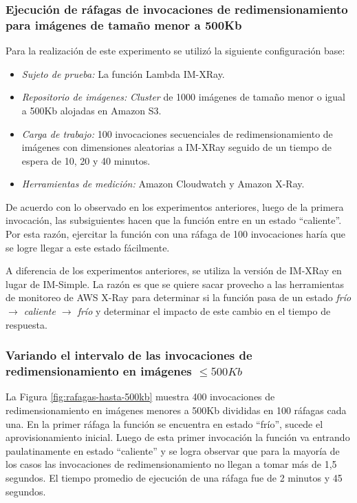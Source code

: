 \subsubsection{Ejecución de ráfagas de invocaciones de redimensionamiento para imágenes de tamaño menor a 500Kb}

Para la realización de este experimento se utilizó la siguiente configuración base:
\begin{itemize}
    \item \emph{Sujeto de prueba:} La función Lambda IM-XRay.
    \item \emph{Repositorio de imágenes:} \emph{Cluster} de 1000 imágenes de tamaño menor o igual a 500Kb alojadas en Amazon S3.
    \item \emph{Carga de trabajo:} 100 invocaciones secuenciales de redimensionamiento de imágenes con dimensiones aleatorias a IM-XRay seguido de un tiempo de espera de 10, 20 y 40 minutos.      
    \item \emph{Herramientas de medición:} Amazon Cloudwatch y Amazon X-Ray.
\end{itemize}
 
De acuerdo con lo observado en los experimentos anteriores, luego de la primera invocación, las subsiguientes hacen que la función entre en un estado ``caliente''. Por esta razón, ejercitar la función con una ráfaga de 100 invocaciones haría que se logre llegar a este estado fácilmente.

A diferencia de los experimentos anteriores, se utiliza la versión de IM-XRay en lugar de IM-Simple. La razón es que se quiere sacar provecho a las herramientas de monitoreo de AWS X-Ray para determinar si la función pasa de un estado \emph{frío $\rightarrow$ caliente $\rightarrow$ frío} y determinar el impacto de este cambio en el tiempo de respuesta.

\subsubsection{Variando el intervalo de las invocaciones de redimensionamiento en imágenes $\leq 500Kb$}\label{sec:rafagas-hasta-500kb}

La Figura \ref{fig:rafagas-hasta-500kb} muestra 400 invocaciones de redimensionamiento en imágenes menores a 500Kb divididas en 100 ráfagas cada una. En la primer ráfaga la función se encuentra en estado ``frío'', sucede el aprovisionamiento inicial. Luego de esta primer invocación la función va entrando paulatinamente en estado ``caliente'' y se logra observar que para la mayoría de los casos las invocaciones de redimensionamiento no llegan a tomar más de 1,5 segundos. El tiempo promedio de ejecución de una ráfaga fue de 2 minutos y 45 segundos.

